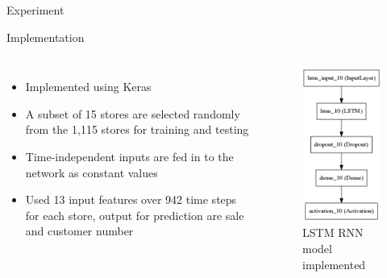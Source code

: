 \documentclass[10pt]{beamer}
\begin{document}
\begin{frame}{Experiment}
    \begin{alertblock}{Implementation}
        \begin{columns}
            \begin{itemize}
                \item Implemented using Keras
                \item A subset of 15 stores are selected randomly from the 1,115 stores for training and testing
                \item Time-independent inputs are fed in to the network as constant values
                \item Used 13 input features over 942 time steps for each store, output for prediction are sale and customer number
            \end{itemize}
            \begin{figure}[H]
                \centering
                \includegraphics[width=0.7\linewidth]{model}
                \caption{LSTM RNN model implemented}
                \label{fig_model}
            \end{figure}
        \end{columns}
    \end{alertblock}
\end{frame}
\end{document}
